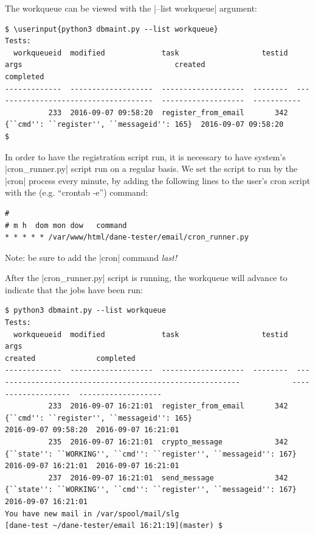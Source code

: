 \documentclass[preprint,3p]{elsarticle}
\newcommand\userinput[1]{\textbf{#1}}
\begin{document}
The workqueue can be viewed with the |--list workqueue| argument:

\begin{Verbatim}[commandchars=\\\{\}]
$ \userinput{python3 dbmaint.py --list workqueue}
Tests:
  workqueueid  modified             task                   testid  args                                   created                completed
-------------  -------------------  -------------------  --------  -------------------------------------  -------------------  -----------
          233  2016-09-07 09:58:20  register_from_email       342  {``cmd'': ``register'', ``messageid'': 165}  2016-09-07 09:58:20
$
\end{Verbatim}


In order to have the registration script run, it is necessary to have
system's |cron_runner.py| script run on a regular basis. We set the
script to run by the |cron| process every minute, by adding the
following lines to the user's cron script with the (e.g. ``crontab
-e'') command:

\begin{Verbatim}
#
# m h  dom mon dow   command
* * * * * /var/www/html/dane-tester/email/cron_runner.py
\end{Verbatim}

Note: be sure to add the |cron| command \emph{last!}

After the |cron_runner.py| script is running, the workqueue will
advance to indicate that the jobs have been run:

\begin{Verbatim}[commandchars=\\\{\}]
 $ python3 dbmaint.py --list workqueue
Tests:
  workqueueid  modified             task                   testid  args                                                                 created              completed
-------------  -------------------  -------------------  --------  ---------------------------------------------------------            -------------------  -------------------
          233  2016-09-07 16:21:01  register_from_email       342  {``cmd'': ``register'', ``messageid'': 165}                          2016-09-07 09:58:20  2016-09-07 16:21:01
          235  2016-09-07 16:21:01  crypto_message            342  {``state'': ``WORKING'', ``cmd'': ``register'', ``messageid'': 167}  2016-09-07 16:21:01  2016-09-07 16:21:01
          237  2016-09-07 16:21:01  send_message              342  {``state'': ``WORKING'', ``cmd'': ``register'', ``messageid'': 167}  2016-09-07 16:21:01
You have new mail in /var/spool/mail/slg
[dane-test ~/dane-tester/email 16:21:19](master) $
\end{Verbatim}
\end{document}
